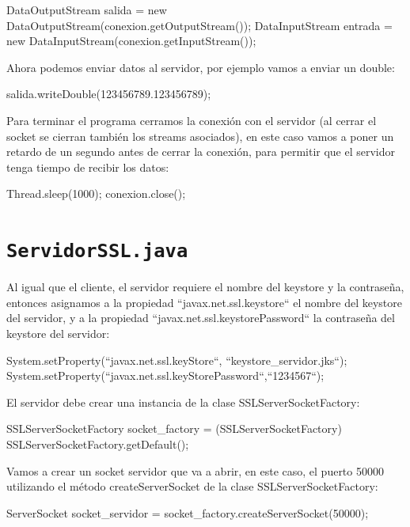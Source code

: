 \documentclass[11pt,a4paper,oneside]{book}
\begin{document}
\begin{SourceCode}
DataOutputStream salida = new DataOutputStream(conexion.getOutputStream());
DataInputStream entrada = new DataInputStream(conexion.getInputStream());
\end{SourceCode}

Ahora podemos enviar datos al servidor, por ejemplo vamos a enviar un double:

\begin{SourceCode}
salida.writeDouble(123456789.123456789);
\end{SourceCode}

Para terminar el programa cerramos la conexión con el servidor (al cerrar el socket se cierran también los streams asociados), en este caso vamos a poner un retardo de un segundo antes de cerrar la conexión, para permitir que el servidor tenga tiempo de recibir los datos:

\begin{SourceCode}
Thread.sleep(1000);
conexion.close();
\end{SourceCode}

\section{\texttt{ServidorSSL.java}}

Al igual que el cliente, el servidor requiere el nombre del keystore y la contraseña, entonces asignamos a la propiedad ``javax.net.ssl.keystore`` el nombre del keystore del servidor, y a la propiedad ``javax.net.ssl.keystorePassword`` la contraseña del keystore del servidor:

\begin{SourceCode}
System.setProperty(``javax.net.ssl.keyStore``, ``keystore_servidor.jks``);
System.setProperty(``javax.net.ssl.keyStorePassword``,``1234567``);
\end{SourceCode}

El servidor debe crear una instancia de la clase SSLServerSocketFactory:

\begin{SourceCode}
SSLServerSocketFactory socket_factory = (SSLServerSocketFactory) SSLServerSocketFactory.getDefault();
\end{SourceCode}

Vamos a crear un socket servidor que va a abrir, en este caso, el puerto 50000 utilizando el método createServerSocket de la clase SSLServerSocketFactory:

\begin{SourceCode}
ServerSocket socket_servidor = socket_factory.createServerSocket(50000);
\end{SourceCode}
\end{document}
